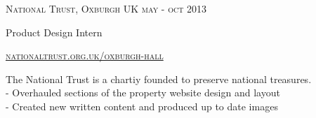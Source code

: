 {
    \textsc{\small{National Trust, Oxburgh UK
        \hfill
            {\raggedleft
                may - oct 2013
            } \\
        }
    }
    {\raggedright\large {
        Product Design Intern
    } \\}

    \textsc{\small\href{http://www.nationaltrust.org.uk/oxburgh-hall}{nationaltrust.org.uk/oxburgh-hall}}

    \normalsize{
        The National Trust is a chartiy founded to preserve national treasures.\\
        - Overhauled sections of the property website design and layout \\
        - Created new written content and produced up to date images
    }
}
